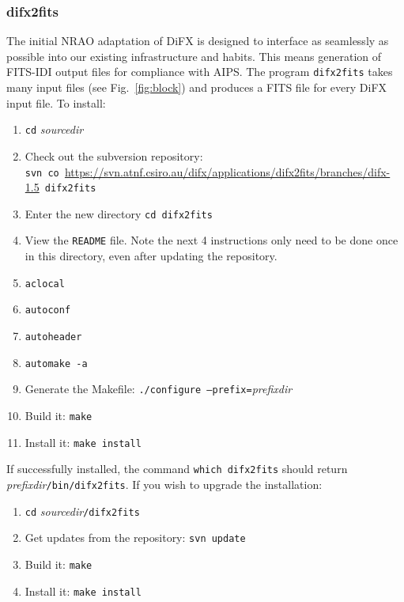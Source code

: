 
\subsubsection{difx2fits}

The initial NRAO adaptation of DiFX is designed to interface as seamlessly as possible into our existing infrastructure and habits.
This means generation of FITS-IDI output files for compliance with AIPS.
The program {\tt difx2fits} takes many input files (see Fig.~\ref{fig:block}) and produces a FITS file for every DiFX input file.
To install:
\begin{enumerate}
\item {\tt cd} {\em sourcedir}
\item Check out the subversion repository: \\
{\tt svn co }\url{https://svn.atnf.csiro.au/difx/applications/difx2fits/branches/difx-1.5}{\tt\ difx2fits}
\item Enter the new directory {\tt cd difx2fits}
\item View the {\tt README} file.  
Note the next 4 instructions only need to be done once in this directory, even after updating the repository.
\item {\tt aclocal}
\item {\tt autoconf}
\item {\tt autoheader}
\item {\tt automake -a}
\item Generate the Makefile: {\tt ./configure --prefix=}{\em prefixdir}
\item Build it: {\tt make}
\item Install it: {\tt make install}
\end{enumerate}

If successfully installed, the command {\tt which difx2fits} should return {\em prefixdir}{\tt /bin/difx2fits}.
If you wish to upgrade the installation:
\begin{enumerate}
\item {\tt cd} {\em sourcedir}{\tt /difx2fits}
\item Get updates from the repository: {\tt svn update}
\item Build it: {\tt make}
\item Install it: {\tt make install}
\end{enumerate}








